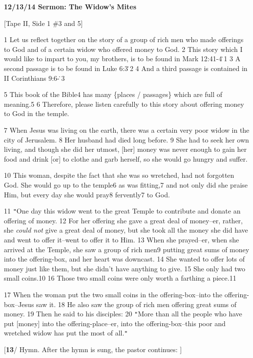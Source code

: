 
\textbf{12/13/14 Sermon: The Widow's Mites}

[Tape II, Side 1 \#3 and 5]

1 Let us reflect together on the story of a group of rich men who made offerings
to God and of a certain widow who offered money to God. 2 This story which I would
like to impart to you, my brothers, is to be found in Mark 12:41-4\.1 3 A second
passage is to be found in Luke 6:3\.2 4 And a third passage is contained in II
Corinthians 9:6-\.3

5 This book of the Bible4 has many \{places / passages\} which are full of meaning.5
6 Therefore, please listen carefully to this story about offering money to God
in the temple.

7 When Jesus was living on the earth, there was a certain very poor widow in the
city of Jerusalem. 8 Her husband had died long before. 9 She had to seek her own
living, and though she did her utmost, [her] money was never enough to gain her
food and drink [or] to clothe and garb herself, so she would go hungry and suffer.

10 This woman, despite the fact that she was so wretched, had not forgotten God.
She would go up to the temple6 as was fitting,7 and not only did she praise Him,
but every day she would pray8 fervently7 to God.

11 \texttt{"}One day this widow went to the great Temple to contribute and donate
an offering of money. 12 For her offering she gave a great deal of money--er, rather,
she \textit{could not} give a great deal of money, but she took all the money she
did have and went to offer it--went to offer it to Him. 13 When she prayed--er,
when she arrived at the Temple, she saw a group of rich men9 putting great sums
of money into the offering-box, and her heart was downcast. 14 She wanted to offer
lots of money just like them, but she didn't have anything to give. 15 She only
had two small coins.10 16 Those two small coins were only worth a farthing a piece.11

17 When the woman put the two small coins in the offering-box--into the offering-box--Jesus
saw it. 18 He also saw the group of rich men offering great sums of money. 19 Then
he said to his disciples: 20 \texttt{"}More than all the people who have put [money]
into the offering-place--er, into the offering-box--this poor and wretched widow
has put the most of all.\texttt{"}

[\textbf{13}/ Hymn. After the hymn is sung, the pastor continues: ]

